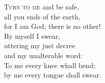 
\lettrine{T}{urn to me} and be safe,\\
all you ends of the earth,\\
for I am God; there is no other!\\
By myself I swear,\\
uttering my just decree\\
and my unalterable word:\\
To me every knee whall bend;\\
by me every tongue shall swear.


